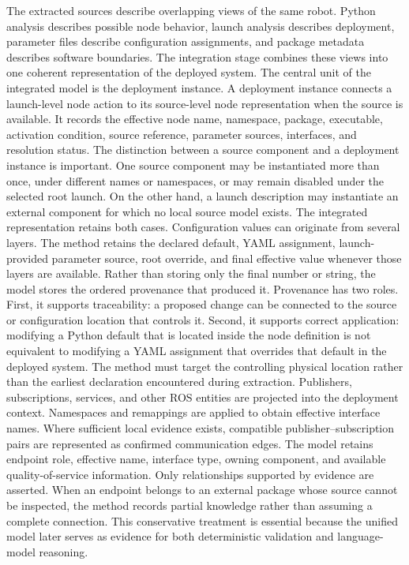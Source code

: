 The extracted sources describe overlapping views of the same robot. Python analysis describes possible node behavior, launch analysis describes deployment, parameter files describe configuration assignments, and package metadata describes software boundaries. The integration stage combines these views into one coherent representation of the deployed system.
The central unit of the integrated model is the deployment instance. A deployment instance connects a launch-level node action to its source-level node representation when the source is available. It records the effective node name, namespace, package, executable, activation condition, source reference, parameter sources, interfaces, and resolution status.
The distinction between a source component and a deployment instance is important. One source component may be instantiated more than once, under different names or namespaces, or may remain disabled under the selected root launch. On the other hand, a launch description may instantiate an external component for which no local source model exists. The integrated representation retains both cases.
Configuration values can originate from several layers. The method retains the declared default, YAML assignment, launch-provided parameter source, root override, and final effective value whenever those layers are available. Rather than storing only the final number or string, the model stores the ordered provenance that produced it.
Provenance has two roles. First, it supports traceability: a proposed change can be connected to the source or configuration location that controls it. Second, it supports correct application: modifying a Python default that is located inside the node definition is not equivalent to modifying a YAML assignment that overrides that default in the deployed system. The method must target the controlling physical location rather than the earliest declaration encountered during extraction.
Publishers, subscriptions, services, and other ROS entities are projected into the deployment context. Namespaces and remappings are applied to obtain effective interface names. Where sufficient local evidence exists, compatible publisher--subscription pairs are represented as confirmed communication edges. The model retains endpoint role, effective name, interface type, owning component, and available quality-of-service information.
Only relationships supported by evidence are asserted. When an endpoint belongs to an external package whose source cannot be inspected, the method records partial knowledge rather than assuming a complete connection. This conservative treatment is essential because the unified model later serves as evidence for both deterministic validation and language-model reasoning.
